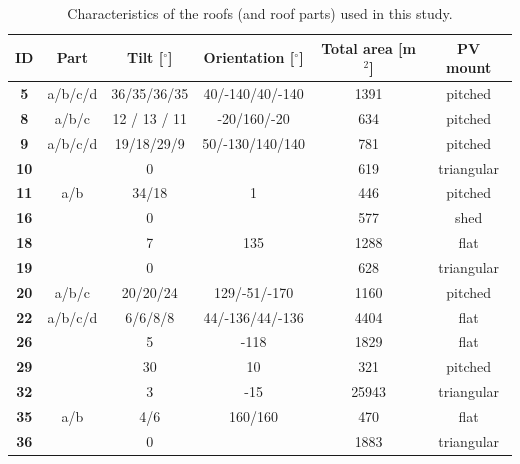 \begin{table}[tb]
\centering
\footnotesize
\caption{Characteristics of the roofs (and roof parts) used in this study.}
\label{tab:valid_roofs}
\begin{tabular}{cccccc}
\hline
\textbf{ID} & \textbf{Part} & \textbf{Tilt [$^\circ$]} & \textbf{Orientation [$^\circ$]} & \textbf{Total area [m$^2$]} & \textbf{PV mount} \\ \hline
\textbf{5}  & a/b/c/d       & 36/35/36/35           & 40/-140/40/-140              & 1391                         & pitched           \\
\textbf{8}  & a/b/c         & 12 / 13 / 11          & -20/160/-20                  & 634                          & pitched           \\
\textbf{9}  & a/b/c/d       & 19/18/29/9            & 50/-130/140/140              & 781                          & pitched           \\
\textbf{10} &               & 0                     &                              & 619                          & triangular        \\
\textbf{11} & a/b           & 34/18                 & 1                            & 446                          & pitched           \\
\textbf{16} &               & 0                     &                              & 577                          & shed              \\
\textbf{18} &               & 7                     & 135                          & 1288                         & flat              \\
\textbf{19} &               & 0                     &                              & 628                          & triangular        \\
\textbf{20} & a/b/c         & 20/20/24              & 129/-51/-170                 & 1160                         & pitched           \\
\textbf{22} & a/b/c/d       & 6/6/8/8               & 44/-136/44/-136              & 4404                         & flat              \\
\textbf{26} &               & 5                     & -118                         & 1829                         & flat              \\
\textbf{29} &               & 30                    & 10                           & 321                          & pitched           \\
\textbf{32} &               & 3                     & -15                          & 25943                        & triangular        \\
\textbf{35} & a/b           & 4/6                   & 160/160                      & 470                          & flat              \\
\textbf{36} &               & 0                     &                              & 1883                         & triangular        \\ \hline
\end{tabular}
\end{table}

